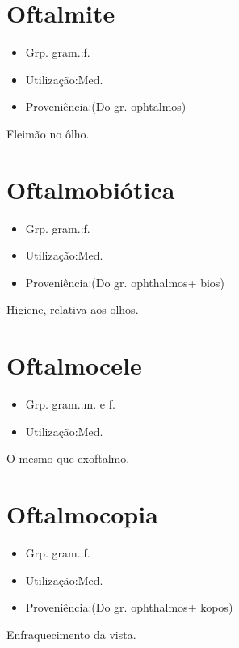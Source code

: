 \section{Oftalmite}
\begin{itemize}
\item {Grp. gram.:f.}
\end{itemize}
\begin{itemize}
\item {Utilização:Med.}
\end{itemize}
\begin{itemize}
\item {Proveniência:(Do gr. \textunderscore ophtalmos\textunderscore )}
\end{itemize}
Fleimão no ôlho.
\section{Oftalmobiótica}
\begin{itemize}
\item {Grp. gram.:f.}
\end{itemize}
\begin{itemize}
\item {Utilização:Med.}
\end{itemize}
\begin{itemize}
\item {Proveniência:(Do gr. \textunderscore ophthalmos\textunderscore  + \textunderscore bios\textunderscore )}
\end{itemize}
Higiene, relativa aos olhos.
\section{Oftalmocele}
\begin{itemize}
\item {Grp. gram.:m.  e  f.}
\end{itemize}
\begin{itemize}
\item {Utilização:Med.}
\end{itemize}
O mesmo que \textunderscore exoftalmo\textunderscore .
\section{Oftalmocopia}
\begin{itemize}
\item {Grp. gram.:f.}
\end{itemize}
\begin{itemize}
\item {Utilização:Med.}
\end{itemize}
\begin{itemize}
\item {Proveniência:(Do gr. \textunderscore ophthalmos\textunderscore  + \textunderscore kopos\textunderscore )}
\end{itemize}
Enfraquecimento da vista.
